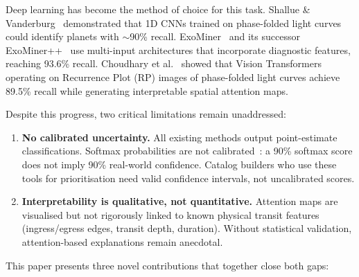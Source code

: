 \documentclass{article}
\begin{document}
Deep learning has become the method of choice for this task.
Shallue \& Vanderburg~\citep{shallue2018} demonstrated that 1D CNNs trained on
phase-folded light curves could identify planets with $\sim$90\% recall.
ExoMiner~\citep{valizadegan2022} and its successor ExoMiner++~\citep{exominerplusplus2025}
use multi-input architectures that incorporate diagnostic features,
reaching 93.6\% recall.
Choudhary et al.~\citep{choudhary2025} showed that Vision Transformers operating
on Recurrence Plot (RP) images of phase-folded light curves achieve 89.5\%
recall while generating interpretable spatial attention maps.

Despite this progress, two critical limitations remain unaddressed:

\begin{enumerate}
  \item \textbf{No calibrated uncertainty.}
  All existing methods output point-estimate classifications.
  Softmax probabilities are not calibrated~\citep{angelopoulos2023}:
  a 90\% softmax score does not imply 90\% real-world confidence.
  Catalog builders who use these tools for prioritisation need valid
  confidence intervals, not uncalibrated scores.

  \item \textbf{Interpretability is qualitative, not quantitative.}
  Attention maps are visualised but not rigorously linked to known physical
  transit features (ingress/egress edges, transit depth, duration).
  Without statistical validation, attention-based explanations remain
  anecdotal.
\end{enumerate}

This paper presents three novel contributions that together close both gaps:
\end{document}
